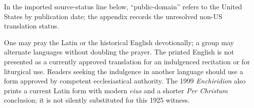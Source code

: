 In the imported source-status line below, ``public-domain'' refers to the United States by publication date; the appendix records the unresolved non-US translation status.



One may pray the Latin or the historical English devotionally; a group may alternate languages without doubling the prayer. The printed English is not presented as a currently approved translation for an indulgenced recitation or for liturgical use. Readers seeking the indulgence in another language should use a form approved by competent ecclesiastical authority. The 1999 \textit{Enchiridion} also prints a current Latin form with modern \textit{eius} and a shorter \textit{Per Christum} conclusion; it is not silently substituted for this 1925 witness.
